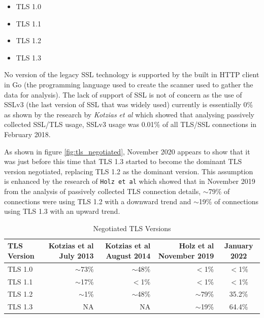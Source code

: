 \documentclass{mscreport}
\begin{document}
\begin{itemize}
  \setlength\itemsep{0.1em}
  \item TLS 1.0
  \item TLS 1.1
  \item TLS 1.2
  \item TLS 1.3
\end{itemize}

\noindent
No version of the legacy SSL technology is supported by the built in HTTP client in Go (the programming language used to create the scanner used to gather the data for analysis). The lack of support of SSL is not of concern as the use of SSLv3 (the last version of SSL that was widely used) currently is essentially 0\% as shown by the research by \textit{Kotzias et al} \cite{Kotzias2018-wd} which showed that analysing passively collected SSL/TLS usage, SSLv3 usage was 0.01\% of all TLS/SSL connections in February 2018.

\vspace{0.3cm} \noindent
As shown in figure \ref{fig:tls_negotiated}, November 2020 appears to show that it was just before this time that TLS 1.3 started to become the dominant TLS version negotiated, replacing TLS 1.2 as the dominant version. This assumption is enhanced by the research of \texttt{Holz et al} \cite{Holz2020-ha} which showed that in November 2019 from the analysis of passively collected TLS connection details, $\sim$79\% of connections were using TLS 1.2 with a downward trend and $\sim$19\% of connections using TLS 1.3 with an upward trend.

\begin{table}[H]
\footnotesize
  \begin{center}
    \begin{tabular}{|l|D|D|D|c|}  %
      \hline
      \textbf{TLS Version} & \textbf{Kotzias et al} \cite{Kotzias2018-wd} July 2013 & \textbf{Kotzias et al} \cite{Kotzias2018-wd} August 2014 & \textbf{Holz et al} \cite{Holz2020-ha} November 2019 & January 2022 \\
      \hline
	  TLS 1.0 & $\sim$73\% & $\sim$48\% & $<$1\% & $<$1\%\\
	  \hline
	  TLS 1.1 & $\sim$17\% & $<$1\% & $<$1\% & $<$1\%\\
	  \hline
	  TLS 1.2 & $\sim$1\% & $\sim$48\% & $\sim$79\% & 35.2\%\\
	  \hline
	  TLS 1.3 & NA & NA & $\sim$19\% & 64.4\%\\
	  \hline
    \end{tabular}
    \caption{Negotiated TLS Versions}
    \label{table:tls_negotiated} %
  \end{center}
\end{table}
\end{document}
